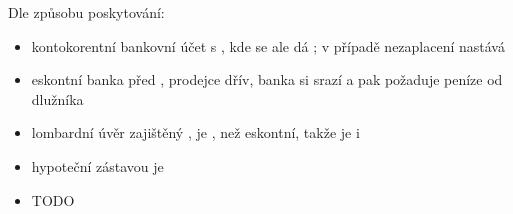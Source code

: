 \documentclass[ekobook.tex]{subfiles}
\begin{document}
{\begin{wnumbered}
Dle způsobu poskytování:
\begin{itemize}[label=\textcolor{WPP}{$\hookrightarrow$}]
\item kontokorentní \texthl{$\rightarrow$} bankovní účet s , kde se ale dá ; v případě nezaplacení nastává 
\item eskontní \texthl{$\rightarrow$} banka  před , prodejce  dřív, banka si srazí  a pak požaduje peníze od dlužníka
\item lombardní \texthl{$\rightarrow$} úvěr zajištěný , je , než eskontní, takže je i 
\item hypoteční \texthl{$\rightarrow$} zástavou je 
\end{itemize}
\item {}
\begin{itemize}[label=\textcolor{WPP}{$\hookrightarrow$}]
\item TODO
\end{itemize}
\end{wnumbered}
}
\vspace{-4em}
\wbreak
\vspace{-2em}
\end{document}

